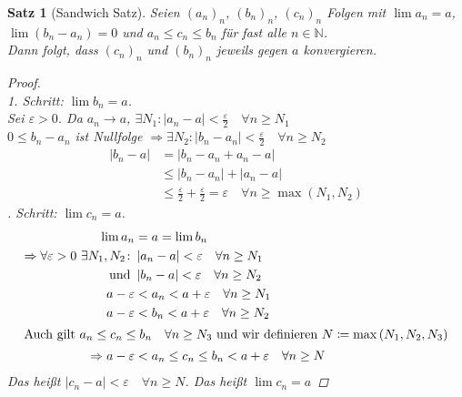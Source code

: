 \documentclass[11pt, twoside, a4paper]{article}
\theoremstyle{plain}
\newtheorem{satz}[blockelement]{Satz}
\newcommand{\pair}[1]{\left(#1\right)}
\newcommand{\abs}[1]{\left|#1\right|}
\newcommand{\impl}[0]{\Rightarrow{}}
\newcommand{\definedas}[0]{\coloneqq}
\newcommand{\fromto}{\rightarrow{}}
\newcommand{\naturalnumbers}{\mathbb{N}}
\begin{document}
    \begin{satz}[Sandwich Satz]
        \label{satz:sandwich}
        Seien $(a_n)_n$, $(b_n)_n$, $(c_n)_n$ Folgen mit $\lim a_n = a$, $\lim \pair{b_n-a_n} = 0$ und $a_n \leq c_n \leq b_n$ für fast alle $n\in\naturalnumbers$.\\
        Dann folgt, dass $(c_n)_n$ und $(b_n)_n$ jeweils gegen $a$ konvergieren.
        \begin{proof}
            ~\\
            1. Schritt: $\lim b_n = a$.\\[10pt]
            Sei $\varepsilon > 0$. Da $a_n\fromto a$, $\exists N_1: \abs{a_n-a} < \frac{\varepsilon}{2}\quad\forall n\geq N_1$\\
            $0\leq b_n-a_n$ ist Nullfolge $\impl \exists N_2: \abs{b_n-a_n} < \frac{\varepsilon}{2}\quad\forall n\geq N_2$\\
            \begin{align*}
                \abs{b_n-a} &= \abs{b_n-a_n+a_n-a}\\
                &\leq \abs{b_n - a_n} + \abs{a_n-a}\\
                &\leq \frac{\varepsilon}{2} + \frac{\varepsilon}{2} = \varepsilon\quad \forall n\geq \max\pair{N_1, N_2}
            \end{align*}
            . Schritt: $\lim c_n = a$.
            \begin{align*}
                \lim a_n &= a = \lim b_n\\
                \impl \forall\varepsilon > 0~\exists N_1, N_2\colon &\abs{a_n-a} < \varepsilon \quad\forall n\geq N_1\\
                \text{ und } &\abs{b_n-a} < \varepsilon \quad\forall n\geq N_2\\
                a-\varepsilon &< a_n < a + \varepsilon\quad\forall n\geq N_1\\
                a-\varepsilon &< b_n < a + \varepsilon\quad\forall n\geq N_2\\
                \intertext{Auch gilt $a_n \leq c_n \leq b_n \quad\forall n\geq N_3$ und wir definieren $N\definedas\max\pair{N_1, N_2, N_3}$}
                \impl a-\varepsilon &< a_n \leq c_n \leq b_n < a + \varepsilon\quad\forall n\geq N
            \end{align*}
            Das heißt $\abs{c_n-a} < \varepsilon\quad\forall n\geq N$. Das heißt $\lim c_n = a$\qedhere
        \end{proof}
    \end{satz}
\end{document}
